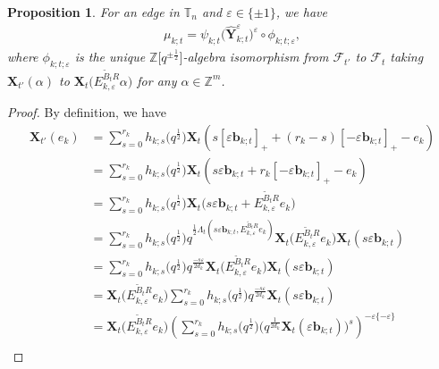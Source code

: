 \documentclass[11pt]{article}
\numberwithin{equation}{section}
\newcommand{\Z}{\mathbb{Z}}
\numberwithin{equation}{section}
\newtheorem{Proposition}[Theorem]{Proposition}
 { \theoremstyle{definition}
\newtheorem{Definition}[Theorem]{Definition}
\newtheorem{Note}[Theorem]{Note}
\newtheorem{Example}[Theorem]{Example}
\newtheorem{Remark}[Theorem]{Remark} }
\begin{document}
\begin{Proposition}\label{quantum-decomposition}
 For an edge  in $\mathbb{T}_n$ and $\varepsilon\in \{\pm 1\}$, we have
 \begin{align}\label{eq:FG-dec-gqca}
 \mu_{k;t}=\psi_{k;t}\bigl(\mathbf{\hat{Y}}_{k;t}^{\varepsilon}\bigr)^{\varepsilon}\circ\phi_{k;t;\varepsilon},
 \end{align}
 where $\phi_{k;t;\varepsilon}$ is the unique $\Z\big[q^{\pm\!\frac{1}{2}}\big]$-algebra isomorphism from $\mathcal{F}_{t'}$ to $\mathcal{F}_{\!t}$ taking $\mathbf{X}_{\!t'}(\alpha)$ to $\mathbf{X}_{t}\bigl(E_{\!k,\varepsilon}^{\tilde{B}_{t}R}\alpha\bigr)$ for any $\alpha\in\mathbb{Z}^{m}$.
\end{Proposition}
\begin{proof}
 By definition, we have
 \begin{align*}
 \mathbf{X}_{t'}(e_{k})
 &=\sum\limits^{r_{k}}_{s=0}h_{k;s}\bigl(q^{\frac{1}{2}}\bigr)\mathbf{X}_{t}(s[\varepsilon\mathbf{b}_{k;t}]_{+}+(r_{k}-s)[-\varepsilon\mathbf{b}_{k;t}]_{+}-e_{k})\\
 & =\sum\limits^{r_{k}}_{s=0}h_{k;s}\bigl(q^{\frac{1}{2}}\bigr)\mathbf{X}_{t}(s\varepsilon\mathbf{b}_{k;t}+r_{k}[-\varepsilon\mathbf{b}_{k;t}]_{+}-e_{k})\\
 &=\sum\limits^{r_{k}}_{s=0}h_{k;s}\bigl(q^{\frac{1}{2}}\bigr)\mathbf{X}_{t}\bigl(s\varepsilon\mathbf{b}_{k;t}+E_{k,\varepsilon}^{\tilde{B}_{t}R}e_{k}\bigr)\\
 &=\sum\limits^{r_{k}}_{s=0}h_{k;s}\bigl(q^{\frac{1}{2}}\bigr)q^{\frac{1}{2}\Lambda_{t}(s\varepsilon\mathbf{b}_{k;t},E_{k,\varepsilon}^{\tilde{B}_{t}R}e_{k})}\mathbf{X}_{t}\bigl(E^{\tilde{B}_{t}R}_{k,\varepsilon}e_{k}\bigr)\mathbf{X}_{t}(s\varepsilon\mathbf{b}_{k;t})\\
 &=\sum\limits^{r_{k}}_{s=0}h_{k;s}\bigl(q^{\frac{1}{2}}\bigr)q^{\frac{-s\varepsilon}{2d_{k}}}\mathbf{X}_{t}\bigl(E^{\tilde{B}_{t}R}_{k,\varepsilon}e_{k}\bigr)\mathbf{X}_{t}(s\varepsilon\mathbf{b}_{k;t})\\
 &=\mathbf{X}_{t}\bigl(E^{\tilde{B}_{t}R}_{k,\varepsilon}e_{k}\bigr)\sum\limits^{r_{k}}_{s=0}h_{k;s}\bigl(q^{\frac{1}{2}}\bigr)q^{\frac{-s\varepsilon}{2d_{k}}}\mathbf{X}_{t}(s\varepsilon\mathbf{b}_{k;t})\\
 &=\mathbf{X}_{t}\bigl(E^{\tilde{B}_{t}R}_{k,\varepsilon}e_{k}\bigr)\left(\sum\limits^{r_{k}}_{s=0}h_{k;s}\bigl(q^{\frac{1}{2}}\bigr)\bigl(q^{\frac{1}{2d_{k}}}\mathbf{X}_{t}(\varepsilon\mathbf{b}_{k;t})\bigr)^{s}\right)^{-\varepsilon\{-\varepsilon\}}\\

\end{align*}
\end{proof}
\end{document}
